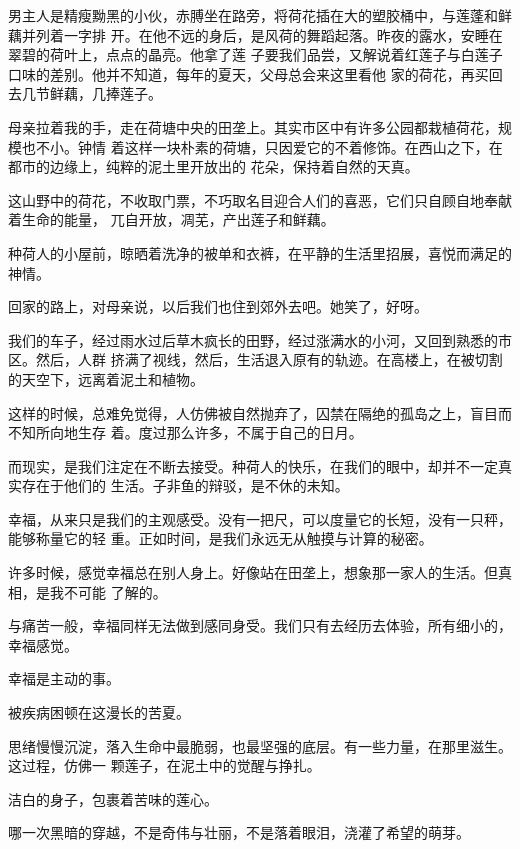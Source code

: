 \documentclass[12pt,a4paper]{article}
\begin{document}
		男主人是精瘦黝黑的小伙，赤膊坐在路旁，将荷花插在大的塑胶桶中，与莲蓬和鲜藕并列着一字排
	开。在他不远的身后，是风荷的舞蹈起落。昨夜的露水，安睡在翠碧的荷叶上，点点的晶亮。他拿了莲
	子要我们品尝，又解说着红莲子与白莲子口味的差别。他并不知道，每年的夏天，父母总会来这里看他
	家的荷花，再买回去几节鲜藕，几捧莲子。

		母亲拉着我的手，走在荷塘中央的田垄上。其实市区中有许多公园都栽植荷花，规模也不小。钟情
	着这样一块朴素的荷塘，只因爱它的不着修饰。在西山之下，在都市的边缘上，纯粹的泥土里开放出的
	花朵，保持着自然的天真。

		这山野中的荷花，不收取门票，不巧取名目迎合人们的喜恶，它们只自顾自地奉献着生命的能量，
	兀自开放，凋芜，产出莲子和鲜藕。

		种荷人的小屋前，晾晒着洗净的被单和衣裤，在平静的生活里招展，喜悦而满足的神情。

		回家的路上，对母亲说，以后我们也住到郊外去吧。她笑了，好呀。

		我们的车子，经过雨水过后草木疯长的田野，经过涨满水的小河，又回到熟悉的市区。然后，人群
	挤满了视线，然后，生活退入原有的轨迹。在高楼上，在被切割的天空下，远离着泥土和植物。

		这样的时候，总难免觉得，人仿佛被自然抛弃了，囚禁在隔绝的孤岛之上，盲目而不知所向地生存
	着。度过那么许多，不属于自己的日月。

		而现实，是我们注定在不断去接受。种荷人的快乐，在我们的眼中，却并不一定真实存在于他们的
	生活。子非鱼的辩驳，是不休的未知。

		幸福，从来只是我们的主观感受。没有一把尺，可以度量它的长短，没有一只秤，能够称量它的轻
	重。正如时间，是我们永远无从触摸与计算的秘密。

		许多时候，感觉幸福总在别人身上。好像站在田垄上，想象那一家人的生活。但真相，是我不可能
	了解的。

		与痛苦一般，幸福同样无法做到感同身受。我们只有去经历去体验，所有细小的，幸福感觉。

		幸福是主动的事。

		被疾病困顿在这漫长的苦夏。

		思绪慢慢沉淀，落入生命中最脆弱，也最坚强的底层。有一些力量，在那里滋生。这过程，仿佛一
	颗莲子，在泥土中的觉醒与挣扎。

		洁白的身子，包裹着苦味的莲心。

		哪一次黑暗的穿越，不是奇伟与壮丽，不是落着眼泪，浇灌了希望的萌芽。

	\endwriting


\end{document}
